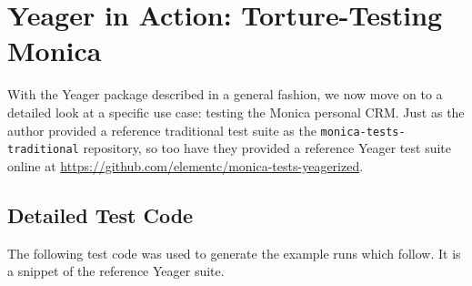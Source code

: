 \section{Yeager in Action: Torture-Testing Monica}
With the Yeager package described in a general fashion, we now move on to a detailed look at a specific use case: testing the Monica personal CRM. Just as the author provided a reference traditional test suite as the \texttt{monica-tests-traditional} repository, so too have they provided a reference Yeager test suite online at \url{https://github.com/elementc/monica-tests-yeagerized}.

\subsection{Detailed Test Code}

The following test code was used to generate the example runs which follow. It is a snippet of the reference Yeager suite.

